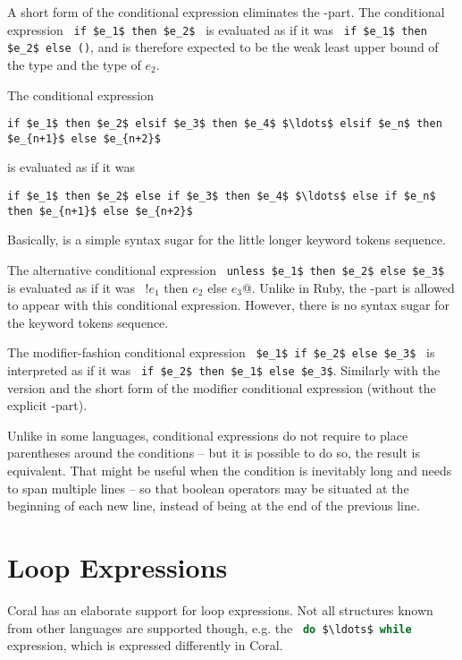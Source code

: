 A short form of the conditional expression eliminates the -part. The conditional expression ~\lstinline!if $e_1$ then $e_2$!~ is evaluated as if it was ~\lstinline!if $e_1$ then $e_2$ else ()!, and is therefore expected to be the weak least upper bound of the type  and the type of $e_2$. 

The conditional expression 
\begin{lstlisting}
if $e_1$ then $e_2$ elsif $e_3$ then $e_4$ $\ldots$ elsif $e_n$ then $e_{n+1}$ else $e_{n+2}$
\end{lstlisting} 
is evaluated as if it was 
\begin{lstlisting}
if $e_1$ then $e_2$ else if $e_3$ then $e_4$ $\ldots$ else if $e_n$ then $e_{n+1}$ else $e_{n+2}$
\end{lstlisting}
Basically,  is a simple syntax sugar for the little longer  keyword tokens sequence. 

The alternative conditional expression ~\lstinline!unless $e_1$ then $e_2$ else $e_3$!~ is evaluated as if it was ~\lstinline@if !$e_1$ then $e_2$ else $e_3$@. Unlike in Ruby, the -part is allowed to appear with this conditional expression. However, there is no syntax sugar for the  keyword tokens sequence. 

The modifier-fashion conditional expression ~\lstinline!$e_1$ if $e_2$ else $e_3$!~ is interpreted as if it was ~\lstinline!if $e_2$ then $e_1$ else $e_3$!. Similarly with the  version and the short form of the modifier conditional expression (without the explicit -part). 

Unlike in some languages, conditional expressions do not require to place parentheses around the conditions -- but it is possible to do so, the result is equivalent. That might be useful when the condition is inevitably long and needs to span multiple lines -- so that boolean operators may be situated at the beginning of each new line, instead of being at the end of the previous line. 






\section{Loop Expressions}

Coral has an elaborate support for loop expressions. Not all structures known from other languages are supported though, e.g. the ~\lstinline[language=Java]!do $\ldots$ while!~ expression, which is expressed differently in Coral. 






